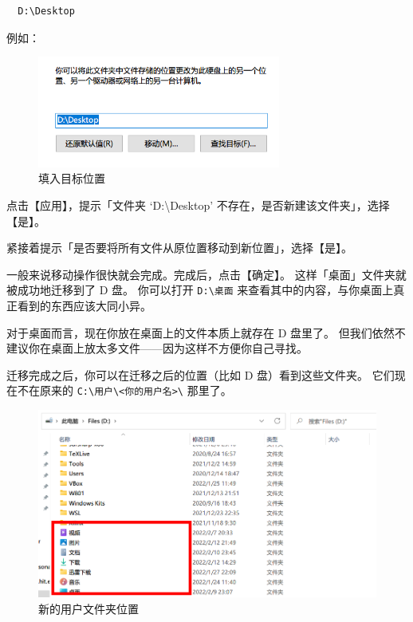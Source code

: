 
\begin{verbatim}
  D:\Desktop
\end{verbatim}

例如：

\begin{figure}[htb!]
  \centering
  \includegraphics[width=8cm]{assets/Destination.png}
  \caption{填入目标位置}
  \label{Destination}
\end{figure}

点击【应用】，提示「文件夹 ‘D:\textbackslash{}Desktop’ 不存在，是否新建该文件夹」，选择【是】。

紧接着提示「是否要将所有文件从原位置移动到新位置」，选择【是】。

一般来说移动操作很快就会完成。完成后，点击【确定】。
这样「桌面」文件夹就被成功地迁移到了 D 盘。
你可以打开 \verb|D:\桌面| 来查看其中的内容，与你桌面上真正看到的东西应该大同小异。

\begin{note}
  对于桌面而言，现在你放在桌面上的文件本质上就存在 D 盘里了。
  但我们依然不建议你在桌面上放太多文件——因为这样不方便你自己寻找。
\end{note}



迁移完成之后，你可以在迁移之后的位置（比如 D 盘）看到这些文件夹。
它们现在不在原来的 \verb|C:\用户\<你的用户名>\| 那里了。

\begin{figure}[htb!]
  \centering
  \includegraphics[width=12cm]{assets/Moved_user_directories.png}
  \caption{新的用户文件夹位置}
  \label{Moved_user_directories}
\end{figure}

